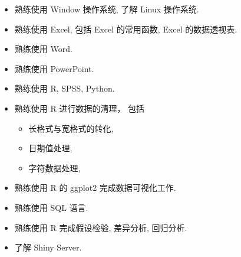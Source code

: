 \begin{itemize}
\item 熟练使用 Window 操作系统, 了解 Linux 操作系统.
\item 熟练使用 Excel, 包括 Excel 的常用函数, Excel 的数据透视表.
\item 熟练使用 Word.
\item 熟练使用 PowerPoint.
\item 熟练使用 R, SPSS, Python.
\item 熟练使用 R 进行数据的清理， 包括
\begin{itemize}
\item 长格式与宽格式的转化,
\item 日期值处理,
\item 字符数据处理,
\end{itemize}
\item 熟练使用 R 的 ggplot2 完成数据可视化工作.
\item 熟练使用 SQL 语言.
\item 熟练使用 R 完成假设检验, 差异分析, 回归分析.
\item 了解 Shiny Server.
\end{itemize}
